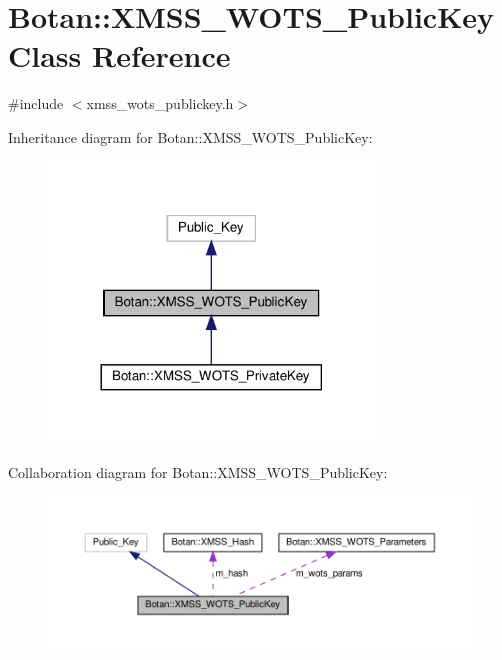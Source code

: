 \hypertarget{class_botan_1_1_x_m_s_s___w_o_t_s___public_key}{}\section{Botan\+:\+:X\+M\+S\+S\+\_\+\+W\+O\+T\+S\+\_\+\+Public\+Key Class Reference}
\label{class_botan_1_1_x_m_s_s___w_o_t_s___public_key}


{\ttfamily \#include $<$xmss\+\_\+wots\+\_\+publickey.\+h$>$}



Inheritance diagram for Botan\+:\+:X\+M\+S\+S\+\_\+\+W\+O\+T\+S\+\_\+\+Public\+Key\+:
\nopagebreak
\begin{figure}[H]
\begin{center}
\leavevmode
\includegraphics[width=245pt]{class_botan_1_1_x_m_s_s___w_o_t_s___public_key__inherit__graph}
\end{center}
\end{figure}


Collaboration diagram for Botan\+:\+:X\+M\+S\+S\+\_\+\+W\+O\+T\+S\+\_\+\+Public\+Key\+:
\nopagebreak
\begin{figure}[H]
\begin{center}
\leavevmode
\includegraphics[width=350pt]{class_botan_1_1_x_m_s_s___w_o_t_s___public_key__coll__graph}
\end{center}
\end{figure}
